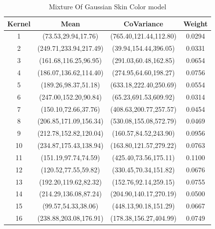 \begin{table}[h]
\begin{tabular}{|c|c|c|c|}
\hline
Kernel &Mean &CoVariance &Weight \\ \hline

1 &(73.53,29.94,17.76) &(765.40,121.44,112.80) &0.0294 \\
2 &(249.71,233.94,217.49) &(39.94,154.44,396.05) &0.0331 \\
3 &(161.68,116.25,96.95) &(291.03,60.48,162.85) &0.0654 \\
4 &(186.07,136.62,114.40) &(274.95,64.60,198.27) &0.0756 \\
5 &(189.26,98.37,51.18) &(633.18,222.40,250.69) &0.0554 \\
6 &(247.00,152.20,90.84) &(65.23,691.53,609.92) &0.0314 \\
7 &(150.10,72.66,37.76) &(408.63,200.77,257.57) &0.0454 \\
8 &(206.85,171.09,156.34) &(530.08,155.08,572.79) &0.0469 \\
9 &(212.78,152.82,120.04) &(160.57,84.52,243.90) &0.0956 \\
10 &(234.87,175.43,138.94) &(163.80,121.57,279.22) &0.0763 \\
11 &(151.19,97.74,74.59) &(425.40,73.56,175.11) &0.1100 \\
12 &(120.52,77.55,59.82) &(330.45,70.34,151.82) &0.0676 \\
13 &(192.20,119.62,82.32) &(152.76,92.14,259.15) &0.0755 \\
14 &(214.29,136.08,87.24) &(204.90,140.17,270.19) &0.0500 \\
15 &(99.57,54.33,38.06) &(448.13,90.18,151.29) &0.0667 \\
16 &(238.88,203.08,176.91) &(178.38,156.27,404.99) &0.0749 \\
\hline
\end{tabular}
\caption{Mixture Of Gaussian Skin Color model}
\label{tab:GMMSkin}
\end{table} 

\newpage

